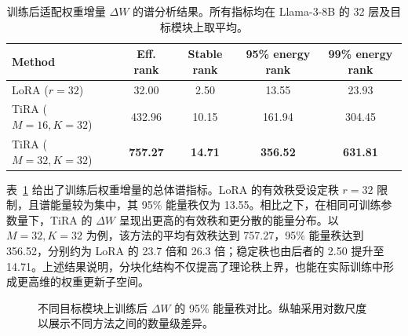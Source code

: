 ﻿\documentclass[UTF8,a4paper,11pt]{ctexart}
\newcommand{\DeltaW}{\Delta W}
\begin{document}
\begin{table}[H]
\centering
\small
\caption{训练后适配权重增量 $\DeltaW$ 的谱分析结果。所有指标均在 Llama-3-8B 的 32 层及目标模块上取平均。}
\label{tab:delta_spectrum}
\begin{tabular}{lcccc}
\toprule
Method & Eff. rank & Stable rank & 95\% energy rank & 99\% energy rank \\
\midrule
LoRA ($r=32$) & 32.00 & 2.50 & 13.55 & 23.93 \\
TiRA ($M=16,K=32$) & 432.96 & 10.15 & 161.94 & 304.45 \\
TiRA ($M=32,K=32$) & \textbf{757.27} & \textbf{14.71} & \textbf{356.52} & \textbf{631.81} \\
\bottomrule
\end{tabular}
\end{table}

表~\ref{tab:delta_spectrum} 给出了训练后权重增量的总体谱指标。LoRA 的有效秩受设定秩 $r=32$ 限制，且谱能量较为集中，其 95\% 能量秩仅为 13.55。相比之下，在相同可训练参数量下，TiRA 的 $\DeltaW$ 呈现出更高的有效秩和更分散的能量分布。以 $M=32,K=32$ 为例，该方法的平均有效秩达到 757.27，95\% 能量秩达到 356.52，分别约为 LoRA 的 23.7 倍和 26.3 倍；稳定秩也由后者的 2.50 提升至 14.71。上述结果说明，分块化结构不仅提高了理论秩上界，也能在实际训练中形成更高维的权重更新子空间。

\begin{figure}[H]
    \centering
    \caption{不同目标模块上训练后 $\DeltaW$ 的 95\% 能量秩对比。纵轴采用对数尺度以展示不同方法之间的数量级差异。}
    \label{fig:delta_spectrum_rank95}
\end{figure}
\end{document}
